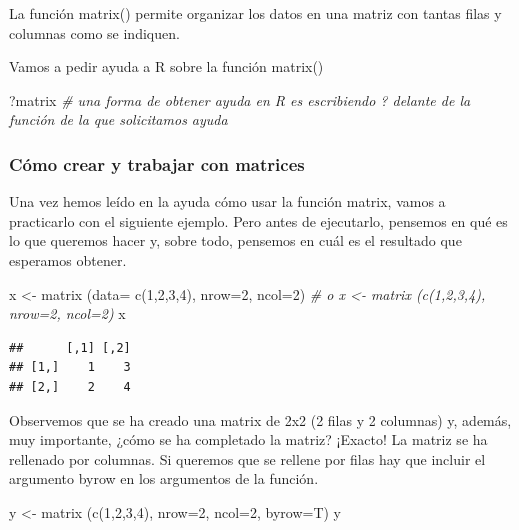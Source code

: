 \documentclass[
]{book}
\newenvironment{Shaded}{\begin{snugshade}}{\end{snugshade}}
\newcommand{\AttributeTok}[1]{\textcolor[rgb]{0.77,0.63,0.00}{#1}}
\newcommand{\CommentTok}[1]{\textcolor[rgb]{0.56,0.35,0.01}{\textit{#1}}}
\newcommand{\DecValTok}[1]{\textcolor[rgb]{0.00,0.00,0.81}{#1}}
\newcommand{\FunctionTok}[1]{\textcolor[rgb]{0.00,0.00,0.00}{#1}}
\newcommand{\NormalTok}[1]{#1}
\newcommand{\OtherTok}[1]{\textcolor[rgb]{0.56,0.35,0.01}{#1}}
\begin{document}
La función matrix() permite organizar los datos en una matriz con tantas filas y columnas como se indiquen.

Vamos a pedir ayuda a R sobre la función matrix()

\begin{Shaded}
\begin{Highlighting}[]
\NormalTok{?matrix }\CommentTok{\# una forma de obtener ayuda en R es escribiendo ? delante de la función de la que solicitamos ayuda}
\end{Highlighting}
\end{Shaded}

\hypertarget{cuxf3mo-crear-y-trabajar-con-matrices}{%
\subsubsection{Cómo crear y trabajar con matrices}\label{cuxf3mo-crear-y-trabajar-con-matrices}}

Una vez hemos leído en la ayuda cómo usar la función matrix, vamos a practicarlo con el siguiente ejemplo. Pero antes de ejecutarlo, pensemos en qué es lo que queremos hacer y, sobre todo, pensemos en cuál es el resultado que esperamos obtener.

\begin{Shaded}
\begin{Highlighting}[]
\NormalTok{x }\OtherTok{\textless{}{-}} \FunctionTok{matrix}\NormalTok{ (}\AttributeTok{data=} \FunctionTok{c}\NormalTok{(}\DecValTok{1}\NormalTok{,}\DecValTok{2}\NormalTok{,}\DecValTok{3}\NormalTok{,}\DecValTok{4}\NormalTok{), }\AttributeTok{nrow=}\DecValTok{2}\NormalTok{, }\AttributeTok{ncol=}\DecValTok{2}\NormalTok{) }\CommentTok{\# o x \textless{}{-} matrix (c(1,2,3,4), nrow=2, ncol=2)}
\NormalTok{x}
\end{Highlighting}
\end{Shaded}

\begin{verbatim}
##      [,1] [,2]
## [1,]    1    3
## [2,]    2    4
\end{verbatim}

Observemos que se ha creado una matrix de 2x2 (2 filas y 2 columnas) y, además, muy importante, ¿cómo se ha completado la matriz? ¡Exacto! La matriz se ha rellenado por columnas. Si queremos que se rellene por filas hay que incluir el argumento byrow en los argumentos de la función.

\begin{Shaded}
\begin{Highlighting}[]
\NormalTok{y }\OtherTok{\textless{}{-}} \FunctionTok{matrix}\NormalTok{ (}\FunctionTok{c}\NormalTok{(}\DecValTok{1}\NormalTok{,}\DecValTok{2}\NormalTok{,}\DecValTok{3}\NormalTok{,}\DecValTok{4}\NormalTok{), }\AttributeTok{nrow=}\DecValTok{2}\NormalTok{, }\AttributeTok{ncol=}\DecValTok{2}\NormalTok{, }\AttributeTok{byrow=}\NormalTok{T)}
\NormalTok{y}
\end{Highlighting}
\end{Shaded}
\end{document}
